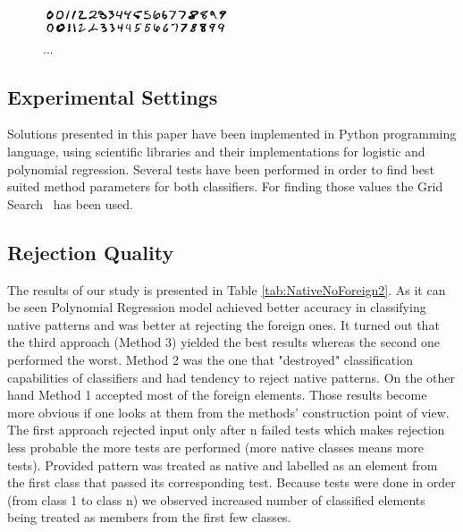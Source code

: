 \documentclass{llncs}
\begin{document}
\begin{figure}[!t]
  \centering
  \includegraphics[width=0.49\textwidth]{_Figures/native}
  \caption{...}
\label{fig:nativeforeignpatterns}
\end{figure}


\subsection{Experimental Settings}
\vspace{-3pt}

Solutions presented in this paper have been implemented in Python programming language, using scientific libraries \cite{NumPy,Scikit} and their implementations for logistic and polynomial regression. Several tests have been performed in order to find best suited method parameters for both classifiers. For finding those values the Grid Search~\cite{Scikit} has been used.



\subsection{Rejection Quality}

The results of our study is presented in Table \ref{tab:NativeNoForeign2}. As it can be seen Polynomial Regression model achieved better accuracy in classifying native patterns and was better at rejecting the foreign ones. It turned out that the third approach (Method 3) yielded the best results whereas the second one performed the worst. Method 2 was the one that "destroyed" classification capabilities of classifiers and had tendency to reject native patterns. On the other hand Method 1 accepted most of the foreign elements. Those results become more obvious if one looks at them from the methods' construction point of view. \\

The first approach rejected input only after n failed tests which makes rejection less probable the more tests are performed (more native classes means more tests). Provided pattern was treated as native and labelled as an element from the first class that passed its corresponding test. Because tests were done in order (from class 1 to class n) we observed increased number of classified elements being treated as members from the first few classes.\\
\end{document}
